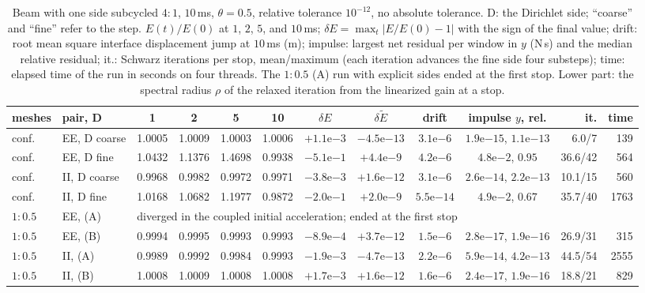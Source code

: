 \documentclass[11pt]{article}
\begin{document}
\begin{table}[htbp]
\centering
\scriptsize\setlength{\tabcolsep}{2pt}
\caption{Beam with one side subcycled $4{:}1$, $10$\,ms, $\theta = 0.5$,
relative tolerance $10^{-12}$, no absolute tolerance. D: the Dirichlet
side; ``coarse'' and ``fine'' refer to the step. $E(t)/E(0)$ at $1$,
$2$, $5$, and $10$\,ms; $\delta E = \max_t \lvert E/E(0) - 1\rvert$ with the
sign of the final value; drift: root mean square interface displacement
jump at $10$\,ms (m); impulse: largest net residual per window in $y$
(N\,s) and the median relative residual; it.: Schwarz iterations per stop,
mean/maximum (each iteration advances the fine side four substeps); time:
elapsed time of the run in seconds on four threads. The $1{:}0.5$ (A) run with explicit sides
ended at the first stop. Lower part: the spectral radius $\rho$ of the
relaxed iteration from the linearized gain at a stop.}
\label{tab:subcycled}
\begin{tabular}{llccccccccrr}
\toprule
meshes & pair, D & 1 & 2 & 5 & 10 & $\delta E$ & $\delta \tilde{E}$ & drift &
  impulse $y$, rel. & it. & time \\
\midrule
conf. & EE, D coarse & 1.0005 & 1.0009 & 1.0003 & 1.0006 & $+1.1\mathrm{e}{-3}$ & $-4.5\mathrm{e}{-13}$ &
  $3.1\mathrm{e}{-6}$ & $1.9\mathrm{e}{-15}$, $1.1\mathrm{e}{-13}$ & 6.0/7 & 139 \\
conf. & EE, D fine & 1.0432 & 1.1376 & 1.4698 & 0.9938 & $-5.1\mathrm{e}{-1}$ & $+4.4\mathrm{e}{-9}$ &
  $4.2\mathrm{e}{-6}$ & $4.8\mathrm{e}{-2}$, $0.95$ & 36.6/42 & 564 \\
conf. & II, D coarse & 0.9968 & 0.9982 & 0.9972 & 0.9971 & $-3.8\mathrm{e}{-3}$ & $+1.6\mathrm{e}{-12}$ &
  $3.1\mathrm{e}{-6}$ & $2.6\mathrm{e}{-14}$, $2.2\mathrm{e}{-13}$ & 10.1/15 & 560 \\
conf. & II, D fine & 1.0168 & 1.0682 & 1.1977 & 0.9872 & $-2.0\mathrm{e}{-1}$ & $+2.0\mathrm{e}{-9}$ &
  $5.5\mathrm{e}{-14}$ & $4.9\mathrm{e}{-2}$, $0.67$ & 35.7/40 & 1763 \\
$1{:}0.5$ & EE, (A) & \multicolumn{10}{l}{diverged in the coupled initial acceleration; ended at the first stop} \\
$1{:}0.5$ & EE, (B) & 0.9994 & 0.9995 & 0.9993 & 0.9993 & $-8.9\mathrm{e}{-4}$ & $+3.7\mathrm{e}{-12}$ &
  $1.5\mathrm{e}{-6}$ & $2.8\mathrm{e}{-17}$, $1.9\mathrm{e}{-16}$ & 26.9/31 & 315 \\
$1{:}0.5$ & II, (A) & 0.9989 & 0.9992 & 0.9984 & 0.9993 & $-1.9\mathrm{e}{-3}$ & $-4.7\mathrm{e}{-13}$ &
  $2.2\mathrm{e}{-6}$ & $5.9\mathrm{e}{-14}$, $4.2\mathrm{e}{-13}$ & 44.5/54 & 2555 \\
$1{:}0.5$ & II, (B) & 1.0008 & 1.0009 & 1.0008 & 1.0008 & $+1.7\mathrm{e}{-3}$ & $+1.6\mathrm{e}{-12}$ &
  $1.6\mathrm{e}{-6}$ & $2.4\mathrm{e}{-17}$, $1.9\mathrm{e}{-16}$ & 18.8/21 & 829 \\
\bottomrule
\end{tabular}


\end{table}
\end{document}
